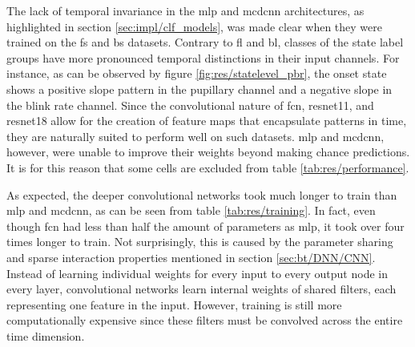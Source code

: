 
The lack of temporal invariance in the \acrshort{mlp} and \acrshort{mcdcnn} architectures, as highlighted in section \ref{sec:impl/clf_models}, was made clear when they were trained on the \acrshort{fs} and \acrshort{bs} datasets. Contrary to \acrshort{fl} and \acrshort{bl}, classes of the state label groups have more pronounced temporal distinctions in their input channels. For instance, as can be observed by figure \ref{fig:res/statelevel_pbr}, the onset state shows a positive slope pattern in the pupillary channel and a negative slope in the blink rate channel. Since the convolutional nature of \acrshort{fcn}, \acrshort{resnet11}, and \acrshort{resnet18} allow for the creation of feature maps that encapsulate patterns in time, they are naturally suited to perform well on such datasets. \acrshort{mlp} and \acrshort{mcdcnn}, however, were unable to improve their weights beyond making chance predictions. It is for this reason that some cells are excluded from table \ref{tab:res/performance}.

As expected, the deeper convolutional networks took much longer to train than \acrshort{mlp} and \acrshort{mcdcnn}, as can be seen from table \ref{tab:res/training}. In fact, even though \acrshort{fcn} had less than half the amount of parameters as \acrshort{mlp}, it took over four times longer to train. Not surprisingly, this is caused by the parameter sharing and sparse interaction properties mentioned in section \ref{sec:bt/DNN/CNN}. Instead of learning individual weights for every input to every output node in every layer, convolutional networks learn internal weights of shared filters, each representing one feature in the input. However, training is still more computationally expensive since these filters must be convolved across the entire time dimension.

